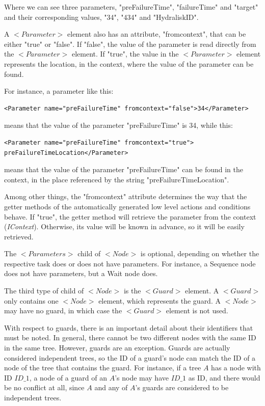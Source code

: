\documentclass[a4paper,10pt]{article}
\begin{document}
Where we can see three parameters, "preFailureTime", "failureTime" and "target" and their corresponding values, "34", "434" and "HydraliskID". 

A $<Parameter>$ element also has an attribute, "fromcontext", that can be either "true" or "false". If "false", the value of the parameter is read directly from the $<Parameter>$ element. If "true", the value in the $<Parameter>$ element represents the location, in the context, where the value of the parameter can be found.

For instance, a parameter like this:

\begin{verbatim}
<Parameter name="preFailureTime" fromcontext="false">34</Parameter>
\end{verbatim}

means that the value of the parameter "preFailureTime" is 34, while this:

\begin{verbatim}
<Parameter name="preFailureTime" fromcontext="true">
preFailureTimeLocation</Parameter>
\end{verbatim}

means that the value of the parameter "preFailureTime" can be found in the context, in the place referenced by the string "preFailureTimeLocation".

Among other things, the "fromcontext" attribute determines the way that the getter methods of the automatically generated low level actions and conditions behave. If "true", the getter method will retrieve the parameter from the context (\textit{IContext}). Otherwise, its value will be known in advance, so it will be easily retrieved.

The $<Parameters>$ child of $<Node>$ is optional, depending on whether the respective task does or does not have parameters. For instance, a Sequence node does not have parameters, but a Wait node does.

The third type of child of $<Node>$ is the $<Guard>$ element. A $<Guard>$ only contains one $<Node>$ element, which represents the guard. A $<Node>$ may have no guard, in which case the $<Guard>$ element is not used. 

With respect to guards, there is an important detail about their identifiers that must be noted. In general, there cannot be two different nodes with the same ID in the same tree. However, guards are an exception. Guards are actually considered independent trees, so the ID of a guard's node can match the ID of a node of the tree that contains the guard. For instance, if a tree $A$ has a node with ID $ID\_1$, a node of a guard of an $A$'s node may have $ID\_1$ as ID, and there would be no conflict at all, since $A$ and any of $A$'s guards are considered to be independent trees.
\end{document}
